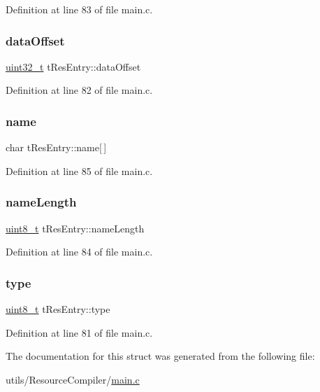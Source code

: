 Definition at line 83 of file main.\+c.

\mbox{\label{structtResEntry_a88513f415b06add371a6b323fecf07ab}} 
\subsubsection{\texorpdfstring{data\+Offset}{dataOffset}}
{\footnotesize\ttfamily \hyperlink{stdint_8h_a435d1572bf3f880d55459d9805097f62}{uint32\+\_\+t} t\+Res\+Entry\+::data\+Offset}



Definition at line 82 of file main.\+c.

\mbox{\label{structtResEntry_af8a44a299155173ce72de5b75683e9fb}} 
\subsubsection{\texorpdfstring{name}{name}}
{\footnotesize\ttfamily char t\+Res\+Entry\+::name\mbox{[}$\,$\mbox{]}}



Definition at line 85 of file main.\+c.

\mbox{\label{structtResEntry_ac0518953ee4a06845374e9a505695434}} 
\subsubsection{\texorpdfstring{name\+Length}{nameLength}}
{\footnotesize\ttfamily \hyperlink{stdint_8h_aba7bc1797add20fe3efdf37ced1182c5}{uint8\+\_\+t} t\+Res\+Entry\+::name\+Length}



Definition at line 84 of file main.\+c.

\mbox{\label{structtResEntry_a47648b5006a5bb90c673c1589b95673c}} 
\subsubsection{\texorpdfstring{type}{type}}
{\footnotesize\ttfamily \hyperlink{stdint_8h_aba7bc1797add20fe3efdf37ced1182c5}{uint8\+\_\+t} t\+Res\+Entry\+::type}



Definition at line 81 of file main.\+c.



The documentation for this struct was generated from the following file\+:\begin{DoxyCompactItemize}
\item 
utils/\+Resource\+Compiler/\hyperlink{utils_2ResourceCompiler_2main_8c}{main.\+c}\end{DoxyCompactItemize}

